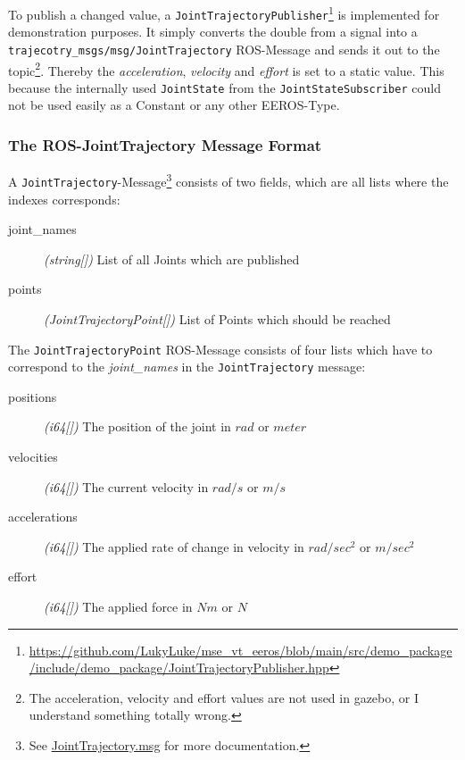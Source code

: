 To publish a changed value, a \texttt{JointTrajectoryPublisher}\footnote{\url{https://github.com/LukyLuke/mse_vt_eeros/blob/main/src/demo_package/include/demo_package/JointTrajectoryPublisher.hpp}} is implemented for demonstration purposes.
It simply converts the double from a signal into a\\
\texttt{trajecotry\_msgs/msg/JointTrajectory} ROS-Message and sends it out to the topic\footnote{The acceleration, velocity and effort values are not used in \Gls{gazebo}, or I understand something totally wrong.}.
Thereby the \textit{acceleration}, \textit{velocity} and \textit{effort} is set to a static value.
This because the internally used \texttt{JointState} from the \texttt{JointStateSubscriber} could not be used easily as a Constant or any other EEROS-Type.

\subsubsection[JointTrajectoryPose-Message]{The ROS-JointTrajectory Message Format} \label{sec:deom-publisher-message}

A \texttt{JointTrajectory}-Message\footnote{See \href{https://docs.ros2.org/latest/api/trajectory_msgs/msg/JointTrajectory.html}{JointTrajectory.msg} for more documentation.} consists of two fields, which are all lists where the indexes corresponds:

\begin{description}
    \item[joint\_names] \textit{(string[])} List of all Joints which are published
    \item[points] \textit{(JointTrajectoryPoint[])} List of Points which should be reached
\end{description}

The \texttt{JointTrajectoryPoint} ROS-Message consists of four lists which have to correspond to the \textit{joint\_names} in the \texttt{JointTrajectory} message:

\begin{description}
    \item[positions] \textit{(i64[])} The position of the joint in $rad$ or $meter$
    \item[velocities] \textit{(i64[])} The current velocity in $rad/s$ or $m/s$
    \item[accelerations] \textit{(i64[])} The applied rate of change in velocity in $rad/sec^2$ or $m/sec^2$
    \item[effort] \textit{(i64[])} The applied force in $Nm$ or $N$
\end{description}



